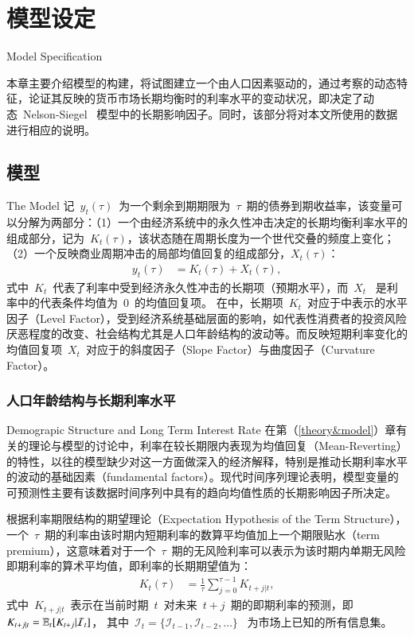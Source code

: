 
\chapter{模型设定}{Model Specification}
\label{chap03}

本章主要介绍模型的构建，将试图建立一个由人口因素驱动的\dns{}，通过考察\ds 的动态特征，论证其反映的货币市场长期均衡时的利率水平的变动状况，即\dsf 决定了动态~Nelson-Siegel~ 模型中的长期影响因子。同时，该部分将对本文所使用的数据进行相应的说明。

\section{模型}{The Model}
记~$y_t(\tau)$~为一个剩余到期期限为~$\tau$~期的债券到期收益率，该变量可以分解为两部分：（1）一个由经济系统中的永久性冲击决定的长期均衡利率水平的组成部分，记为~$K_t(\tau)$，该状态随\dsf 在周期长度为一个世代交叠的频度上变化；（2）一个反映商业周期冲击的局部均值回复的组成部分，$X_t(\tau)$：
\begin{align}\label{chap03:yield}
   y_t(\tau) & = K_t(\tau) + X_t(\tau),
 \end{align}
式中~$K_t$~代表了利率中受到经济永久性冲击的长期项（预期水平），而~$X_t$~ 是利率中的代表条件均值为~0~的均值回复项。
在中，长期项~$K_t$~对应于中表示\dns 的水平因子（Level Factor），受到经济系统基础层面的影响，如代表性消费者的投资风险厌恶程度的改变、社会结构尤其是人口年龄结构的波动等。而反映短期利率变化的均值回复项~$X_t$~对应于\dns 的斜度因子（Slope Factor）与曲度因子（Curvature Factor）。

\subsection{人口年龄结构与长期利率水平}{Demograpic Structure and Long Term Interest Rate}
在第（\ref{theory&model}）章有关\ts 的理论与模型的讨论中，利率在较长期限内表现为均值回复（Mean-Reverting）的特性，以往的模型缺少对这一方面做深入的经济解释，特别是推动长期利率水平的波动的基础因素（fundamental factors）。现代时间序列理论表明，模型变量的可预测性主要有该数据时间序列中具有的趋向均值性质的长期影响因子所决定。

根据利率期限结构的期望理论（Expectation Hypothesis of the Term Structure），一个~$\tau$~期的利率由该时期内短期利率的数算平均值加上一个期限贴水（term premium），这意味着对于一个~$\tau$~期的无风险利率可以表示为该时期内单期无风险即期利率的算术平均值，即利率的长期期望值为：
  \begin{align}\label{k}
   K_{t}(\tau) &=  \frac{1}{\tau}\sum_{j=0}^{\tau-1}K_{t+j|t},
 \end{align}
 式中~$K_{t+j|t}$~表示在当前时期~$t$~对未来~$t+j$~期的即期利率的预测，即~$K_{t+j|t}=\mathbb{E}_t[K_{t+j}|\mathcal{I}_t]$，
 其中~$\mathcal{I}_t=\{\mathcal{I}_{t-1},\mathcal{I}_{t-2},\ldots\}$~ 为市场上已知的所有信息集。

